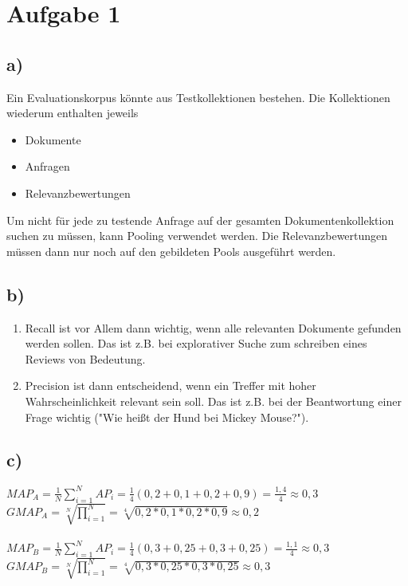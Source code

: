 \section*{Aufgabe 1}

\subsection*{a)}
Ein Evaluationskorpus könnte aus Testkollektionen bestehen. Die Kollektionen wiederum enthalten jeweils 
\begin{itemize}
\item Dokumente
\item Anfragen
\item Relevanzbewertungen
\end{itemize}
Um nicht für jede zu testende Anfrage auf der gesamten Dokumentenkollektion suchen zu müssen, kann Pooling verwendet werden. Die Relevanzbewertungen müssen dann nur noch auf den gebildeten Pools ausgeführt werden.

\subsection*{b)}
\begin{enumerate}
\item Recall ist vor Allem dann wichtig, wenn alle relevanten Dokumente gefunden werden sollen. Das ist z.B. bei explorativer Suche zum schreiben eines Reviews von Bedeutung. 
\item Precision ist dann entscheidend, wenn ein Treffer mit hoher Wahrscheinlichkeit relevant sein soll. Das ist z.B. bei der Beantwortung einer Frage wichtig ("Wie heißt der Hund bei Mickey Mouse?"). 
\end{enumerate}

\subsection*{c)}
$MAP_{A} = \frac{1}{N} \sum_{i=1}^{N} AP_{i} = \frac{1}{4} (0,2 + 0,1 + 0,2 + 0,9) = \frac{1,4}{4} \approx 0,3$ \\
$GMAP_{A} = \sqrt[N]{\prod_{i=1}^{N}} = \sqrt[4]{0,2 * 0,1 * 0,2 * 0,9} \approx 0,2$\\
\ \\
$MAP_{B} = \frac{1}{N} \sum_{i=1}^{N} AP_{i} = \frac{1}{4} (0,3 + 0,25 + 0,3 + 0,25) = \frac{1,1}{4} \approx 0,3 $\\
$GMAP_{B} = \sqrt[N]{\prod_{i=1}^{N}} = \sqrt[4]{0,3 * 0,25 * 0,3 * 0,25} \approx 0,3$\\
